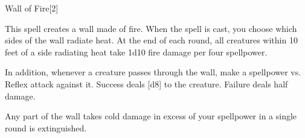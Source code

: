 \begin{spellsection}{Wall of Fire}[2]
    \begin{spellheader}
    \end{spellheader}
    \begin{spellcontent}
        \begin{spelltargetinginfo}
        \end{spelltargetinginfo}
        \begin{spelleffects}
            \spelleffect This spell creates a wall made of fire.
            When the spell is cast, you choose which sides of the wall radiate heat.
            At the end of each round, all creatures within 10 feet of a side radiating heat take 1d10 fire damage per four spellpower.

            In addition, whenever a creature passes through the wall, make a spellpower vs. Reflex attack against it.
            Success deals [d8] to the creature.
            Failure deals half damage.
            \spelldur \durshort
        \end{spelleffects}
    \end{spellcontent}
    \begin{spellfooter}
        \spellnotes Any part of the wall takes cold damage in excess of your spellpower in a single round is extinguished.
        \miscastexplode
    \end{spellfooter}
    \begin{spellaugments}
    \end{spellaugments}
\end{spellsection}


